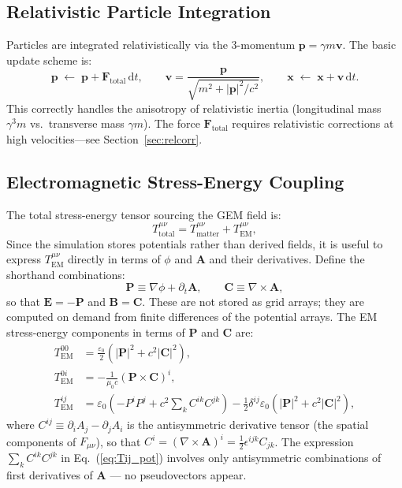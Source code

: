 \documentclass[11pt,a4paper]{article}
\newcommand{\vv}[1]{\mathbf{#1}}
\newcommand{\dd}{\mathrm{d}}
\begin{document}
\subsection{Relativistic Particle Integration}

Particles are integrated relativistically via the 3-momentum $\vv{p} = \gamma m\vv{v}$.  The basic update scheme is:
\begin{equation}
  \vv{p} \;\leftarrow\; \vv{p} + \vv{F}_{\mathrm{total}}\,\dd t, \qquad
  \vv{v} = \frac{\vv{p}}{\sqrt{m^2 + |\vv{p}|^2/c^2}}, \qquad
  \vv{x} \;\leftarrow\; \vv{x} + \vv{v}\,\dd t.
\end{equation}
This correctly handles the anisotropy of relativistic inertia (longitudinal mass $\gamma^3 m$ vs.\ transverse mass $\gamma m$).  The force $\vv{F}_{\mathrm{total}}$ requires relativistic corrections at high velocities---see Section~\ref{sec:relcorr}.

\subsection{Electromagnetic Stress-Energy Coupling}

The total stress-energy tensor sourcing the GEM field is:
\begin{equation}
  T^{\mu\nu}_{\mathrm{total}} = T^{\mu\nu}_{\mathrm{matter}} + T^{\mu\nu}_{\mathrm{EM}},
\end{equation}
Since the simulation stores potentials rather than derived fields, it is useful to express $T^{\mu\nu}_{\mathrm{EM}}$ directly in terms of $\phi$ and $\vv{A}$ and their derivatives.  Define the shorthand combinations:
\begin{equation}
  \vv{P} \equiv \nabla\phi + \partial_t\vv{A}, \qquad
  \vv{C} \equiv \nabla\times\vv{A},
\end{equation}
so that $\vv{E} = -\vv{P}$ and $\vv{B} = \vv{C}$.  These are not stored as grid arrays; they are computed on demand from finite differences of the potential arrays.  The EM stress-energy components in terms of $\vv{P}$ and $\vv{C}$ are:
\begin{align}
  T^{00}_{\mathrm{EM}} &= \frac{\varepsilon_0}{2}\!\left(|\vv{P}|^2 + c^2|\vv{C}|^2\right), \label{eq:T00_pot}\\
  T^{0i}_{\mathrm{EM}} &= -\frac{1}{\mu_0 c}\!\left(\vv{P}\times\vv{C}\right)^i, \label{eq:T0i_pot}\\
  T^{ij}_{\mathrm{EM}} &= \varepsilon_0\!\left(-P^i P^j + c^2\sum_k C^{ik}C^{jk}\right) - \tfrac{1}{2}\delta^{ij}\varepsilon_0\!\left(|\vv{P}|^2+c^2|\vv{C}|^2\right), \label{eq:Tij_pot}
\end{align}
where $C^{ij} \equiv \partial_i A_j - \partial_j A_i$ is the antisymmetric derivative tensor (the spatial components of $F_{\mu\nu}$), so that $C^i = (\nabla\times\vv{A})^i = \tfrac{1}{2}\epsilon^{ijk}C_{jk}$.  The expression $\sum_k C^{ik}C^{jk}$ in Eq.~(\ref{eq:Tij_pot}) involves only antisymmetric combinations of first derivatives of $\vv{A}$ --- no pseudovectors appear.
\end{document}
